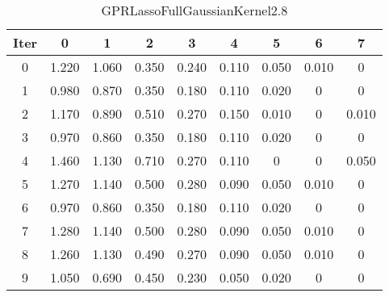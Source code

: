 \begin{table}
	\begin{center}
		\begin{tabular}{|c|c|c|c|c|c|c|c|c|}
			\hline
			Iter & 0 & 1 & 2 & 3 & 4 & 5 & 6 & 7 \\
			\hline
			0 & 1.220 & 1.060 & 0.350 & 0.240 & 0.110 & 0.050 & 0.010 & 0 \\
			\hline
			1 & 0.980 & 0.870 & 0.350 & 0.180 & 0.110 & 0.020 & 0 & 0 \\
			\hline
			2 & 1.170 & 0.890 & 0.510 & 0.270 & 0.150 & 0.010 & 0 & 0.010 \\
			\hline
			3 & 0.970 & 0.860 & 0.350 & 0.180 & 0.110 & 0.020 & 0 & 0 \\
			\hline
			4 & 1.460 & 1.130 & 0.710 & 0.270 & 0.110 & 0 & 0 & 0.050 \\
			\hline
			5 & 1.270 & 1.140 & 0.500 & 0.280 & 0.090 & 0.050 & 0.010 & 0 \\
			\hline
			6 & 0.970 & 0.860 & 0.350 & 0.180 & 0.110 & 0.020 & 0 & 0 \\
			\hline
			7 & 1.280 & 1.140 & 0.500 & 0.280 & 0.090 & 0.050 & 0.010 & 0 \\
			\hline
			8 & 1.260 & 1.130 & 0.490 & 0.270 & 0.090 & 0.050 & 0.010 & 0 \\
			\hline
			9 & 1.050 & 0.690 & 0.450 & 0.230 & 0.050 & 0.020 & 0 & 0 \\
			\hline
		\end{tabular}
	\end{center}
	\caption{GPRLassoFullGaussianKernel2.8}
\end{table}